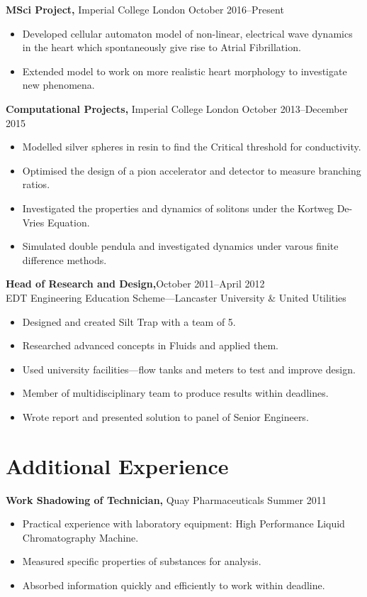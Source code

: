 \documentclass[margin]{res}
\begin{document}
\begin{resume}
 {\bf MSci Project,} Imperial College London \hfill October 2016--Present
 \begin{itemize} \itemsep -2pt  %
\item Developed cellular automaton model of non-linear, electrical wave dynamics in the heart which spontaneously give rise to Atrial Fibrillation.
\item Extended model to work on more realistic heart morphology to investigate new phenomena. 
\end{itemize}



 {\bf Computational Projects,} Imperial College London \hfill October 2013--December 2015
 \begin{itemize} \itemsep -2pt  %
\item Modelled silver spheres in resin to find the Critical threshold for conductivity.
\item Optimised the design of a pion accelerator and detector to measure branching ratios.
 \item Investigated the properties and dynamics of solitons under the Kortweg De-Vries Equation.
\item Simulated double pendula and investigated dynamics under varous finite difference methods.



 \end{itemize}

 {\bf Head of Research and Design,}\hfill October 2011--April 2012\\ EDT Engineering Education Scheme---Lancaster University \& United Utilities 
 \begin{itemize} \itemsep -2pt  %
 \item Designed and created Silt Trap with a team of 5.
\item Researched advanced concepts in Fluids and applied them.
\item Used university facilities---flow tanks and meters to test and improve design.
\item Member of multidisciplinary team to produce results within deadlines.
 \item Wrote report and presented solution to panel of Senior Engineers.
 
 \end{itemize}


 \section{Additional Experience} 
{\bf Work Shadowing of Technician,} Quay Pharmaceuticals \hfill  Summer 2011
\begin{itemize} \itemsep -2pt %
\item Practical experience with laboratory equipment: High Performance Liquid Chromatography Machine.
\item Measured specific properties of substances for analysis.
\item Absorbed information quickly and efficiently to work within deadline.
\end{itemize}


\end{resume}
\end{document}

